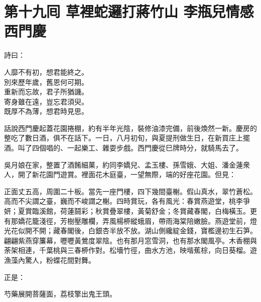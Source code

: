 
\chapter*{第十九囘 草裡蛇邏打蔣竹山 李瓶兒情感西門慶}


詩曰：

\begin{myquote}
人靡不有初，想君能終之。\\別來歷年歲，舊恩何可期。\\重新而忘故，君子所猶譏。\\寄身雖在遠，豈忘君須臾。\\既厚不為薄，想君時見思。
\end{myquote}

話說西門慶起蓋花園捲棚，約有半年光陰，裝修油漆完備，前後煥然一新。慶房的整吃了數日酒，俱不在話下。一日，八月初旬，與夏提刑做生日，在新買庄上擺酒。叫了四個唱的、一起樂工、雜耍步戲。西門慶從巳牌時分，就騎馬去了。

吳月娘在家，整置了酒餚細菓，約同李嬌兒、孟玉樓、孫雪娥、大姐、潘金蓮衆人，開了新花園門遊賞。裡面花木庭臺，一望無際，端的好座花園。但見：

\begin{myquote}
正面丈五高，周圍二十板。當先一座門樓，四下幾間臺榭。假山真水，翠竹蒼松。高而不尖謂之臺，巍而不峻謂之榭。四時賞玩，各有風光：春賞燕遊堂，桃李爭妍；夏賞臨溪館，荷蓮鬪彩；秋賞疊翠樓，黃菊舒金；冬賞藏春閣，白梅橫玉。更有那嬌花籠淺徑，芳樹壓雕欄，弄風楊桺縱蛾眉，帶雨海棠陪嫩臉。燕遊堂前，燈光花似開不開；藏春閣後，白銀杏半放不放。湖山側纔綻金錢，寶檻邊初生石笋。翩翩紫燕穿簾幕，嚦嚦黃鶯度翠陰。也有那月窓雪洞，也有那水閣風亭。木香棚與荼架相連，千葉桃與三春桺作對。松墻竹徑，曲水方池，映堦蕉棕，向日葵榴。遊漁藻內驚人，粉蝶花間對舞。

正是：

芍藥展開菩薩面，荔枝擎出鬼王頭。
\end{myquote}

